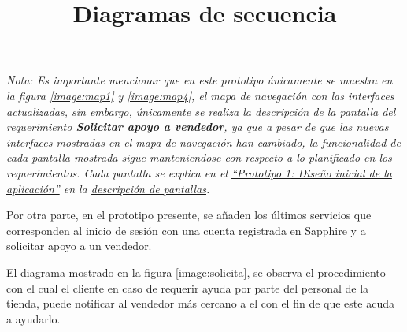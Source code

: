 \textit{Nota: Es importante mencionar que en este prototipo únicamente se muestra en la figura \ref{image:map1} y \ref{image:map4}, el mapa de navegación con las interfaces actualizadas, sin embargo, únicamente se realiza la descripción de la pantalla del requerimiento \textbf{Solicitar apoyo a vendedor}, ya que a pesar de que las nuevas interfaces mostradas en el mapa de navegación han cambiado, la funcionalidad de cada pantalla mostrada sigue manteniendose con respecto a lo planificado en los requerimientos. Cada pantalla se explica en el \hyperlink{Prototipo1}{``Prototipo 1: Diseño inicial de la aplicación''} en la \hyperlink{Pantallas}{descripción de pantallas}.} 
\\ \par 
Por otra parte, en el prototipo presente, se añaden los últimos servicios que corresponden al inicio de sesión con una cuenta registrada en Sapphire y a solicitar apoyo a un vendedor. \\ \par
\title{\textbf{Diagramas de secuencia}\\ \par}
El diagrama mostrado en la figura \ref{image:solicita}, se observa el procedimiento con el cual el cliente en caso de requerir ayuda por parte del personal de la tienda, puede notificar al vendedor más cercano a el con el fin de que este acuda a ayudarlo.


